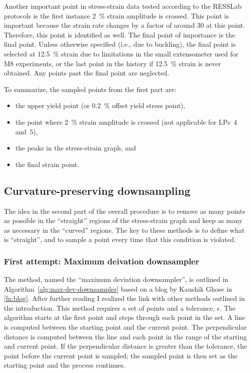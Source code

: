 \documentclass[a4paper,11pt]{article}
\begin{document}
Another important point in stress-strain data tested according to the RESSLab protocols is the first instance 2~\% strain amplitude is crossed.
This point is important because the strain rate changes by a factor of around 30 at this point.
Therefore, this point is identified as well.
The final point of importance is the final point.
Unless otherwise specified (i.e., due to buckling), the final point is selected at 12.5~\% strain due to limitations in the small extensometer used for M8 experiments, or the last point in the history if 12.5~\% strain is never obtained.
Any points past the final point are neglected.

To summarize, the sampled points from the first part are:
\begin{itemize}
    \item the upper yield point (or 0.2~\% offset yield stress point),
    \item the point where 2~\% strain amplitude is crossed (not applicable for LPs~4 and~5),
    \item the peaks in the stress-strain graph, and
    \item the final strain point.
\end{itemize}

\subsection{Curvature-preserving downsampling}

The idea in the second part of the overall procedure is to remove as many points as possible in the ``straight'' regions of the stress-strain graph and keep as many as necessary in the ``curved'' regions.
The key to these methods is to define what is ``straight'', and to sample a point every time that this condition is violated.

\subsubsection{First attempt: Maximum deivation downsampler}

The method, named the ``maximum deviation downsampler'', is outlined in Algorithm~\ref{alg:max-dev-downsampler} based on a blog by Kaushik Ghose in \cref{fn:blog}.
After further reading I realized the link with other methods outlined in the introduction.
This method requires a set of points and a tolerance, $\epsilon$.
The algorithm starts at the first point and steps through each point in the set.
A line is computed between the starting point and the current point.
The perpendicular distance is computed between the line and each point in the range of the starting and current point.
If the perpendicular distance is greater than the tolerance, the point before the current point is sampled; the sampled point is then set as the starting point and the process continues.
\end{document}
